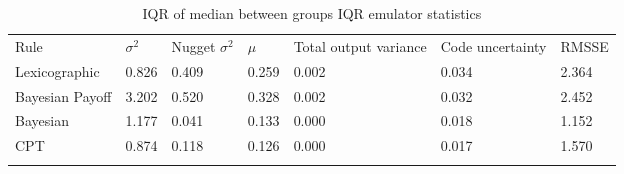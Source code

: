 \begin{table}[H]
\caption{IQR of median between groups IQR emulator statistics \label{tab:sa_emulator_iqr_iqr}}
\begin{tabular} {lllllll}
\hline\noalign{\smallskip}
Rule & \(\sigma^2\) & Nugget \(\sigma^2\) & $\mu$ & Total output variance & Code uncertainty & RMSSE \\
\noalign{\smallskip}\svhline\noalign{\smallskip}
Lexicographic & 0.826 & 0.409 & 0.259 & 0.002 & 0.034 & 2.364 \\
Bayesian Payoff & 3.202 & 0.520 & 0.328 & 0.002 & 0.032 & 2.452 \\
Bayesian & 1.177 & 0.041 & 0.133 & 0.000 & 0.018 & 1.152 \\
\ac{CPT} & 0.874 & 0.118 & 0.126 & 0.000 & 0.017 & 1.570 \\
\noalign{\smallskip}\hline\noalign{\smallskip}
\end{tabular}
\end{table}


